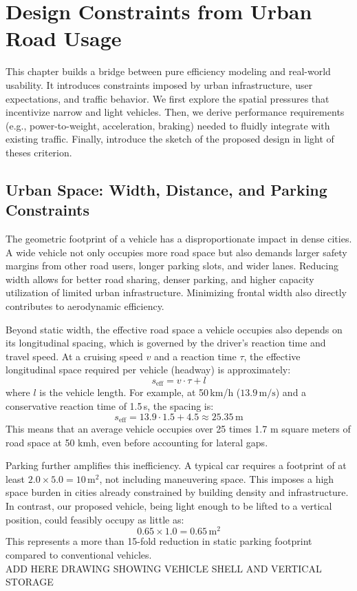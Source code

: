 \section{Design Constraints from Urban Road Usage}

This chapter builds a bridge between pure efficiency modeling and real-world usability. It introduces constraints imposed by urban infrastructure, user expectations, and traffic behavior. We first explore the spatial pressures that incentivize narrow and light vehicles. Then, we derive performance requirements (e.g., power-to-weight, acceleration, braking) needed to fluidly integrate with existing traffic. Finally, introduce the sketch of the proposed design in light of theses criterion.

\subsection{Urban Space: Width, Distance, and Parking Constraints}

The geometric footprint of a vehicle has a disproportionate impact in dense cities. A wide vehicle not only occupies more road space but also demands larger safety margins from other road users, longer parking slots, and wider lanes. Reducing width allows for better road sharing, denser parking, and higher capacity utilization of limited urban infrastructure. Minimizing frontal width also directly contributes to aerodynamic efficiency. 

Beyond static width, the effective road space a vehicle occupies also depends on its longitudinal spacing, which is governed by the driver's reaction time and travel speed. At a cruising speed \(v\) and a reaction time \(\tau\), the effective longitudinal space required per vehicle (headway) is approximately:
\[
s_{\text{eff}} = v \cdot \tau + l
\]
where \(l\) is the vehicle length. For example, at 50\,km/h (\(13.9\,\text{m/s}\)) and a conservative reaction time of 1.5\,s, the spacing is:
\[
s_{\text{eff}} = 13.9 \cdot 1.5 + 4.5 \approx 25.35\,\text{m}
\]
This means that an average vehicle occupies over 25 times 1.7 m square meters of road space at 50 kmh, even before accounting for lateral gaps.

Parking further amplifies this inefficiency. A typical car requires a footprint of at least \(2.0 \times 5.0 = 10\,\text{m}^2\), not including maneuvering space. This imposes a high space burden in cities already constrained by building density and infrastructure.\\
In contrast, our proposed vehicle, being light enough to be lifted to a vertical position, could feasibly occupy as little as:
\[
\boxed{0.65 \times 1.0 = 0.65\,\text{m}^2}
\]
This represents a more than 15-fold reduction in static parking footprint compared to conventional vehicles.\\
ADD HERE DRAWING SHOWING VEHICLE SHELL AND VERTICAL STORAGE
